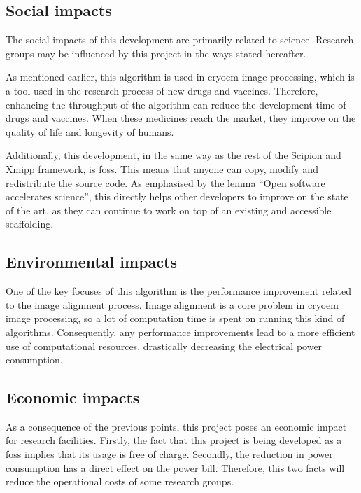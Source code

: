 \documentclass[../main.tex]{subfiles}
\begin{document}
\subsection{Social impacts}
The social impacts of this development are primarily related to science. Research groups may be influenced by this project in the ways stated hereafter.

As mentioned earlier, this algorithm is used in \gls{cryoem} image processing, which is a tool used in the research process of new drugs and vaccines. Therefore, enhancing the throughput of the algorithm can reduce the development time of drugs and vaccines. When these medicines reach the market, they improve on the quality of life and longevity of humans.

Additionally, this development, in the same way as the rest of the Scipion and Xmipp framework, is \gls{foss}. This means that anyone can copy, modify and redistribute the source code. As emphasised by the lemma ``Open software accelerates science'', this directly helps other developers to improve on the state of the art, as they can continue to work on top of an existing and accessible scaffolding.

\subsection{Environmental impacts}
One of the key focuses of this algorithm is the performance improvement related to the image alignment process. Image alignment is a core problem in \gls{cryoem} image processing, so a lot of computation time is spent on running this kind of algorithms. Consequently, any performance improvements lead to a more efficient use of computational resources, drastically decreasing the electrical power consumption.

\subsection{Economic impacts}
As a consequence of the previous points, this project poses an economic impact for research facilities. Firstly, the fact that this project is being developed as a \gls{foss} implies that its usage is free of charge. Secondly, the reduction in power consumption has a direct effect on the power bill. Therefore, this two facts will reduce the operational costs of some research groups.
\end{document}
